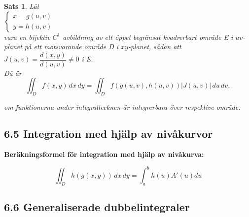 \documentclass[a4paper]{article}
\newtheorem{thm}{Sats}
\begin{document}
\begin{thm}
Låt \\

 $\begin{cases} 
    x = g(u,v) \\
    y = h(u,v)
  \end{cases}  $
  \\
  
  vara en bijektiv $C^1$ avbildning av ett öppet begränsat kvadrerbart område E i $uv$-planet på ett motsvarande område D i $xy$-planet, sådan att \\
   $J(u,v) = \dfrac{d(x,y)}{d(u,v)} \neq 0 $ i E. \\
 
    Då är
    \begin{equation}
    \iint_D f(x,y)\,dx \,dy = \iint_D f(g(u,v),h(u,v))|J(u,v)|\,du \,dv,
    \end{equation}
  
  om funktionerna under integraltecknen är integrerbara över respektive område.
  




\end{thm}

\subsection*{6.5 Integration med hjälp av nivåkurvor}

\textbf{Beräkningsformel för integration med hjälp av nivåkurva:}

\begin{equation}
\iint_D h(g(x,y)) \,dx \,dy = \int_a^b h(u)A'(u) du
\end{equation}

\subsection*{6.6 Generaliserade dubbelintegraler}
\end{document}
